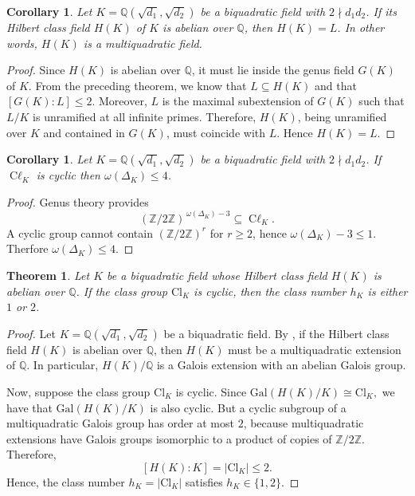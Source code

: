 \documentclass[12 pt]{amsart}
\newcommand{\Q}{\mathbb{Q}}
\newcommand{\Z}{\mathbb{Z}}
\newcommand\Gal{{\mathrm {Gal}}}
\newtheorem{theorem}[thm]{Theorem}
\newtheorem{cor}[thm]{Corollary}
\theoremstyle{definition}
\theoremstyle{remark}
\DeclareMathOperator{\Cl}{C\ell}
\begin{document}
\begin{cor}\label{Hilbert_classfield_for_biquadratic}
 Let $K=\Q(\sqrt{d_1},\sqrt{d_2})$ be a biquadratic field with  $2\nmid d_1d_2$. If  its Hilbert class field $H(K)$ of $K$ is abelian over $\Q$, then $H(K)=L$. In  other words, $H(K)$ is a multiquadratic field.
\end{cor}

\begin{proof}
Since $H(K)$ is abelian over $\Q$, it must lie inside the genus field $G(K)$ of $K$.
From the preceding theorem, we know that $L\subseteq H(K)$ and that $[G(K):L]\le2$.
Moreover, $L$ is the maximal subextension of $G(K)$ such that $L/K$ is unramified
at all infinite primes. Therefore, $H(K)$, being unramified over $K$ and contained
in $G(K)$, must coincide with $L$. Hence $H(K)=L$.
\end{proof}


\begin{cor}\label{cyclic:omega_result}
Let $K=\Q(\sqrt{d_1},\sqrt{d_2})$ be a biquadratic field with $2\nmid d_1d_2$.
If $\Cl_K$ is cyclic then $\omega(\Delta_K)\le4$.
\end{cor}

\begin{proof}
Genus theory provides
\[
(\Z/2\Z)^{\,\omega(\Delta_K)-3}\subseteq\Cl_K.
\]
A cyclic group cannot contain $(\Z/2\Z)^r$ for $r\ge2$, hence
$\omega(\Delta_K)-3\le1$.  Therfore  $\omega(\Delta_K)\le4$.
\end{proof}




	\begin{theorem}\label{Biquadrati:cyclicclass}
		Let $K$ be a biquadratic field whose Hilbert class field $H(K)$ is abelian over $\mathbb{Q}$. If the class group $\mathrm{Cl}_K$ is cyclic, then the class number $h_K$ is either $1$ or $2$.
	\end{theorem}
	
	\begin{proof}
		Let $K = \mathbb{Q}(\sqrt{d_1}, \sqrt{d_2})$ be a biquadratic field. By , if the Hilbert class field $H(K)$ is abelian over $\mathbb{Q}$, then $H(K)$ must be a multiquadratic extension of $\mathbb{Q}$. In particular, $H(K)/\mathbb{Q}$ is a Galois extension with an abelian Galois group.

        \noindent
		Now, suppose the class group $\mathrm{Cl}_K$ is cyclic. Since $\Gal(H(K)/K) \cong \mathrm{Cl}_K,$
		we have that $\mathrm{Gal}(H(K)/K)$ is also cyclic. But a cyclic subgroup of a multiquadratic Galois group has order at most $2$, because multiquadratic extensions have Galois groups isomorphic to a product of copies of $\mathbb{Z}/2\mathbb{Z}$. Therefore,
		\[
		[H(K) : K] = |\mathrm{Cl}_K| \leq 2.
		\]
		Hence, the class number $h_K = |\mathrm{Cl}_K|$ satisfies $h_K \in \{1, 2\}$.
	\end{proof}
	
\end{document}
